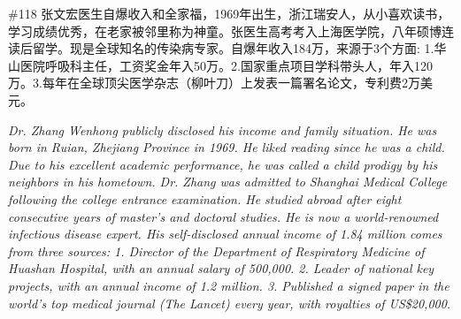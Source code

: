 \documentclass [11pt, proquest] {uwthesis}[2020/02/24]
\begin{document}
\begin{CJK*}{UTF8}{gbsn}\#118 张文宏医生自爆收入和全家福，1969年出生，浙江瑞安人，从小喜欢读书，学习成绩优秀，在老家被邻里称为神童。张医生高考考入上海医学院，八年硕博连读后留学。现是全球知名的传染病专家。自爆年收入184万，来源于3个方面: 1.华山医院呼吸科主任，工资奖金年入50万。2.国家重点项目学科带头人，年入120万。3.每年在全球顶尖医学杂志（柳叶刀）上发表一篇署名论文，专利费2万美元。\end{CJK*}

\textit{Dr. Zhang Wenhong publicly disclosed his income and family situation. He was born in Ruian, Zhejiang Province in 1969. He liked reading since he was a child. Due to his excellent academic performance, he was called a child prodigy by his neighbors in his hometown. Dr. Zhang was admitted to Shanghai Medical College following the college entrance examination. He studied abroad after eight consecutive years of master's and doctoral studies. He is now a world-renowned infectious disease expert. His self-disclosed annual income of 1.84 million comes from three sources: 1. Director of the Department of Respiratory Medicine of Huashan Hospital, with an annual salary of 500,000. 2. Leader of national key projects, with an annual income of 1.2 million. 3. Published a signed paper in the world's top medical journal (The Lancet) every year, with royalties of US\$20,000.}\\
\end{document}
